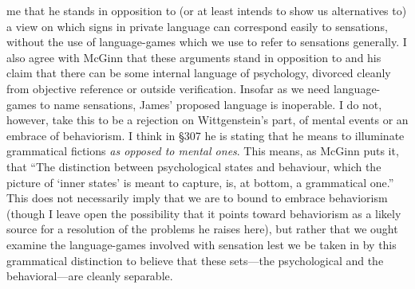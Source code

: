 \documentclass[doc,12pt,apacite,biblatex]{apa6}
\begin{document}
me that he stands in opposition to (or at least intends to show us alternatives
to) a view on which signs in private language can correspond easily to
sensations, without the use of language-games which we use to refer to
sensations generally.
I also agree with McGinn that these arguments stand in opposition to
 and his claim that there can be some internal language of
psychology, divorced cleanly from objective reference or outside verification.
Insofar as we need language-games to name sensations, James' proposed language
is inoperable. I do not, however, take this to be a rejection on Wittgenstein's
part, of mental events or an embrace of behaviorism. I think in \S 307 he is
stating that he means to illuminate grammatical fictions \emph{as opposed to
mental ones}. This means, as McGinn puts it, that ``The distinction between
psychological states and behaviour, which the picture of `inner states' is
meant to capture, is, at bottom, a grammatical one.'' This does not necessarily
imply that we are to bound to embrace behaviorism (though I leave open the
possibility that it points toward behaviorism as a likely source for a
resolution of the problems he raises here), but rather that we ought examine
the language-games involved with sensation lest we be taken in by this
grammatical distinction to believe that these sets---the psychological and the
behavioral---are cleanly separable.
\end{document}
